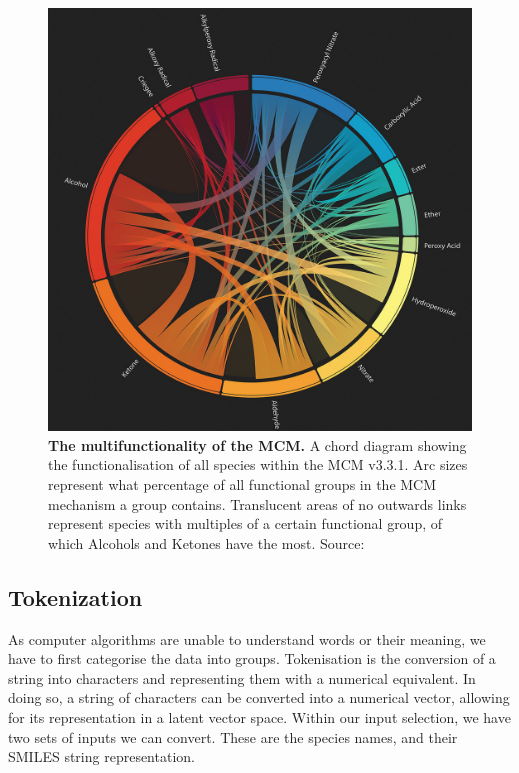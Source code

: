 \begin{figure}[H]
    \centering
    \includegraphics[width=\textwidth]{4fig/coverfig.jpg}
    \caption{\textbf{The multifunctionality of the MCM.} A chord diagram showing the functionalisation of all species within the MCM v3.3.1. Arc sizes represent what percentage of all functional groups in the MCM mechanism a group contains. Translucent areas of no outwards links represent species with multiples of a certain functional group, of which Alcohols and Ketones have the most.
    Source: \citep{cover} }
    \label{fig:covermcm}
\end{figure}



\subsection{Tokenization}
As computer algorithms are unable to understand words or their meaning, we have to first categorise the data into groups. Tokenisation is the conversion of a string into characters and representing them with a numerical equivalent. In doing so, a string of characters can be converted into a numerical vector, allowing for its representation in a latent vector space.
Within our input selection, we have two sets of inputs we can convert. These are the species names, and their SMILES string representation.



